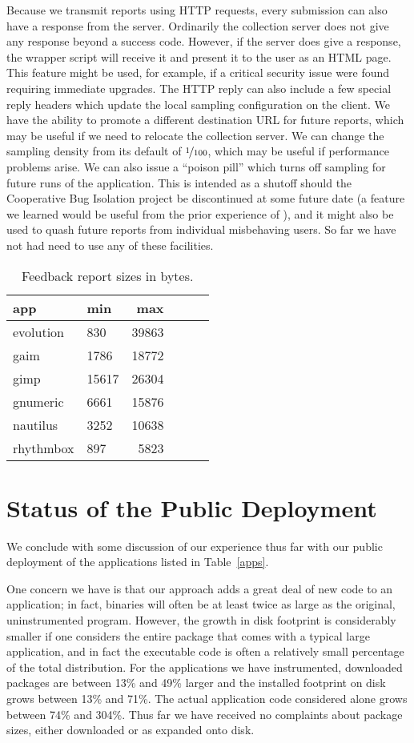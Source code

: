 \documentclass[times,10pt,twocolumn]{article}
\begin{document}
Because we transmit reports using HTTP requests, every submission
can also have a response from the server.
Ordinarily the collection server does not give any response beyond a
success code.  However, if the server does give a response, the
wrapper script will receive it and present it to the user as an HTML
page.  This feature might be used, for example, if a critical security
issue were found requiring immediate upgrades.  
The HTTP reply can also include a few special reply headers which
update the local sampling configuration on the client.  We have the
ability to promote a different destination URL for future reports,
which may be useful if we need to relocate the collection server.  We
can change the sampling density from its default of $\nicefrac{1}{100}$, which may be
useful if performance problems arise.  We can also issue a ``poison
pill'' which turns off sampling for future runs of the application.
This is intended as a shutoff should the Cooperative Bug
Isolation project be discontinued at some future date (a feature we
learned would be useful from the prior experience of \cite{Elbaum:2003:DISATA}), and it might also
be used to quash future reports from individual misbehaving users.  So
far we have not had need to use any of these facilities.  

\begin{table}
  \centering
  \begin{tabular}{llrrrr}
    app & min & max  \\ \hline
    evolution & 830 & 39863  \\
    gaim & 1786 & 18772  \\
    gimp & 15617 & 26304  \\
    gnumeric & 6661 & 15876  \\
    nautilus & 3252 & 10638  \\
    rhythmbox & 897 & 5823 
  \end{tabular}
  \caption{Feedback report sizes in bytes.}
  \label{report-sizes}
\end{table}

\section{Status of the Public Deployment}

We conclude with some discussion of our experience thus far with our public
deployment of the applications listed in Table~\ref{apps}.

One concern we have is that our approach adds a great deal of new code
to an application; in fact, binaries will often be at least twice as
large as the original, uninstrumented program.  However, the growth in
disk footprint is considerably smaller if one considers the entire
package that comes with a typical large application, and in fact the
executable code is often a relatively small percentage of the total
distribution.  For the applications we have instrumented, downloaded
packages are between 13\% and 49\% larger and the installed footprint on
disk grows between 13\% and 71\%.  The actual application code
considered alone grows between 74\% and 304\%.  Thus far we have
received no complaints about package sizes, either downloaded or as
expanded onto disk.
\end{document}
